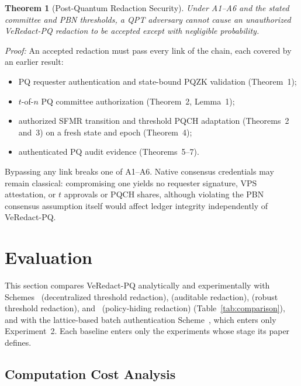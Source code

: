 \documentclass[lettersize,journal]{IEEEtran}
\newtheorem{theorem}{Theorem}
\begin{document}
\begin{theorem}[Post-Quantum Redaction Security]
Under A1--A6 and the stated committee and PBN thresholds, a QPT
adversary cannot cause an unauthorized VeRedact-PQ redaction to be
accepted except with negligible probability.
\end{theorem}

\emph{Proof:} An accepted redaction must pass every link of the chain,
each covered by an earlier result:
\begin{itemize}[leftmargin=*,nosep]
\item PQ requester authentication and state-bound PQZK validation
(Theorem~1);
\item $t$-of-$n$ PQ committee authorization (Theorem~2, Lemma~1);
\item authorized SFMR transition and threshold PQCH adaptation
(Theorems~2 and~3) on a fresh state and epoch (Theorem~4);
\item authenticated PQ audit evidence (Theorems~5--7).
\end{itemize}
Bypassing any link breaks one of A1--A6. Native consensus credentials may
remain classical: compromising one yields no requester signature, VPS
attestation, or $t$ approvals or PQCH shares, although violating the PBN
consensus assumption itself would affect ledger integrity independently
of VeRedact-PQ.

    
    \section{Evaluation}
    \label{sec:evaluation}
    
    This section compares VeRedact-PQ analytically and experimentally with
    Schemes~\cite{ref1} (decentralized threshold redaction),
    \cite{ref13} (auditable redaction), \cite{ref27} (robust threshold
    redaction), and~\cite{ref34} (policy-hiding redaction)
    (Table~\ref{tab:comparison}), and with the lattice-based batch
    authentication Scheme~\cite{ref39}, which enters only Experiment~2.
    Each baseline enters only the experiments whose stage its paper
    defines.

\subsection{Computation Cost Analysis}
\label{subsec:computation-cost}
\end{document}
